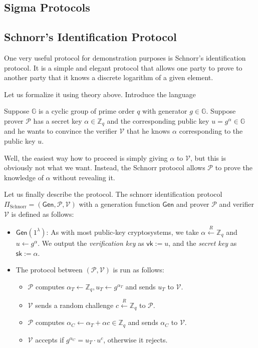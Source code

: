\documentclass[../lecture-notes.tex]{subfiles}
\begin{document}
\subsection{Sigma Protocols}

\subsection{Schnorr's Identification Protocol}

One very useful protocol for demonstration purposes is Schnorr's identification protocol. It is a simple and elegant protocol that allows one party to prove to another party that it knows a discrete logarithm of a given element. 

Let us formalize it using theory above. Introduce the language 

Suppose $\mathbb{G}$ is a cyclic group of prime order $q$ with generator $g \in \mathbb{G}$. Suppose prover $\mathcal{P}$ has a secret key $\alpha \in \mathbb{Z}_q$ and the corresponding public key $u = g^{\alpha} \in \mathbb{G}$ and he wants to convince the verifier $\mathcal{V}$ that he knows $\alpha$ corresponding to the public key $u$. 

Well, the easiest way how to proceed is simply giving $\alpha$ to $\mathcal{V}$, but this is obviously not what we want. Instead, the Schnorr protocol allows $\mathcal{P}$ to prove the knowledge of $\alpha$ without revealing it. 

Let us finally describe the protocol. The schnorr identification protocol $\Pi_{\text{Schnorr}} = (\mathsf{Gen}, \mathcal{P}, \mathcal{V})$ with a generation function $\mathsf{Gen}$ and prover $\mathcal{P}$ and verifier $\mathcal{V}$ is defined as follows:
\begin{itemize}
    \item $\mathsf{Gen}(1^{\lambda})$: As with most public-key cryptosystems, we take $\alpha \xleftarrow{R} \mathbb{Z}_q$ and $u \gets g^{\alpha}$. We output the \textit{verification key} as $\mathsf{vk} := u$, and the \textit{secret key} as $\mathsf{sk} := \alpha$.
    \item The protocol between $(\mathcal{P},\mathcal{V})$ is run as follows:
    \begin{itemize}
        \item $\mathcal{P}$ computes $\alpha_T \gets \mathbb{Z}_q, u_T \gets g^{\alpha_T}$ and sends $u_T$ to $\mathcal{V}$.
        \item $\mathcal{V}$ sends a random challenge $c \xleftarrow{R} \mathbb{Z}_q$ to $\mathcal{P}$.
        \item $\mathcal{P}$ computes $\alpha_C \gets \alpha_T + \alpha c \in \mathbb{Z}_q$ and sends $\alpha_C$ to $\mathcal{V}$.
        \item $\mathcal{V}$ accepts if $g^{\alpha_C} = u_T \cdot u^c$, otherwise it rejects.
    \end{itemize}
\end{itemize}
\end{document}
